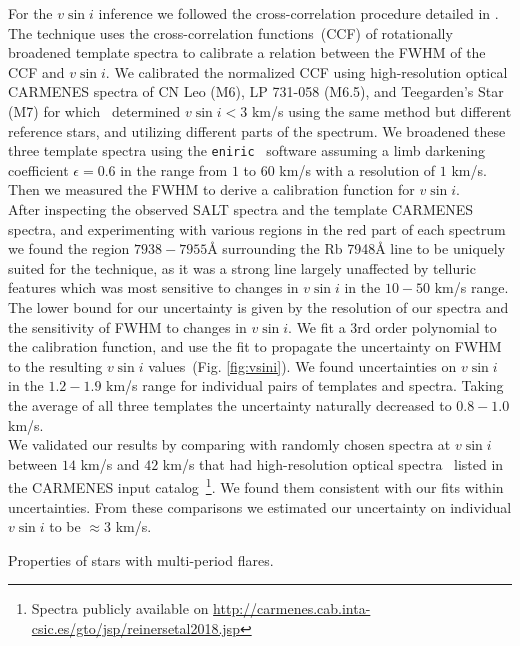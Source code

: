 \documentclass[fleqn,usenatbib,letters]{mnras}%
\begin{document}
For the $v\sin i$ inference we followed the cross-correlation procedure detailed in \citet{reiners2012}.
The technique uses the cross-correlation functions~(CCF) of rotationally broadened template spectra to calibrate a relation between the FWHM of the CCF and $v\sin i$. We calibrated the normalized CCF using high-resolution optical CARMENES spectra of CN Leo (M6), LP 731-058 (M6.5), and Teegarden's Star (M7) for which~\citet{reiners2018} determined $v\sin i < 3$ km/s using the same method but different reference stars, and utilizing different parts of the spectrum. We broadened these three template spectra using the \texttt{eniric}~\citep{neal2019} software assuming a limb darkening coefficient $\epsilon=0.6$ in the range from $1$ to $60$ km/s with a resolution of $1$ km/s. Then we measured the FWHM to derive a calibration function for $v\sin i$.
\\
After inspecting the observed SALT spectra and the template CARMENES spectra, and experimenting with various regions in the red part of each spectrum we found the region $7938-7955$\AA\; surrounding the Rb 7948\AA\; line to be uniquely suited for the technique, as it was a strong line largely unaffected by telluric features which was most sensitive to changes in $v\sin i$ in the $10-50$ km/s range. The lower bound for our uncertainty is given by the resolution of our spectra and the sensitivity of FWHM to changes in $v\sin i$. We fit a 3rd order polynomial to the calibration function, and use the fit to propagate the uncertainty on FWHM to the resulting $v\sin i$ values~(Fig. \ref{fig:vsini}). We found uncertainties on $v\sin i$ in the $1.2-1.9$ km/s range for individual pairs of templates and spectra. Taking the average of all three templates the uncertainty naturally decreased to $0.8-1.0$ km/s.
\\
We validated our results by comparing with randomly chosen spectra at $v\sin i$ between $14$ km/s and $42$ km/s that had high-resolution optical spectra~\citep{reiners2018} listed in the CARMENES input catalog~\citep{jeffers2018}\footnote{Spectra publicly available on \url{http://carmenes.cab.inta-csic.es/gto/jsp/reinersetal2018.jsp}}. We found them consistent with our fits within uncertainties. From these comparisons we estimated our uncertainty on individual $v\sin i$ to be $\approx 3$ km/s.


\begin{table}
\centering
\caption{Properties of stars with multi-period flares.}
\label{tab:properties}

\end{table}
\end{document}
